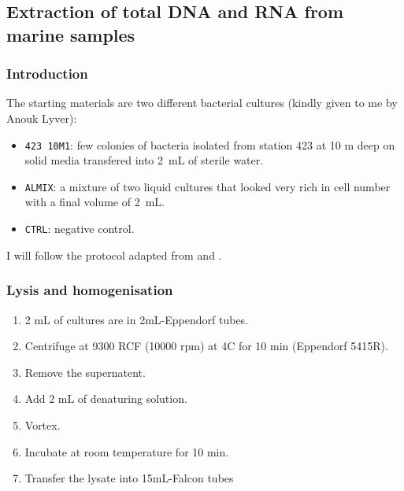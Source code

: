 \subsection{Extraction of total DNA and RNA from marine samples}
\label{task:20180112_cj1}


\subsubsection{Introduction}

The starting materials are two different bacterial cultures (kindly given to me by Anouk Lyver):
\begin{itemize}
\item[] \texttt{423 10M1}: few colonies of bacteria isolated from station 423 at 10 m deep on solid media transfered into 2~mL of sterile water.
\item[] \texttt{ALMIX}: a mixture of two liquid cultures that looked very rich in cell number with a final volume of 2~mL.
\item[] \texttt{CTRL}: negative control.
\end{itemize}

I will follow the protocol adapted from \citet{schneider2017extraction} and \citet{chomczynski2006single}.

\subsubsection{Lysis and homogenisation}

\begin{enumerate}
\item 2 mL of cultures are in 2mL-Eppendorf tubes.
\item Centrifuge at 9300 RCF (10000 rpm) at 4\degree C for 10 min (Eppendorf 5415R).
\item Remove the supernatent.
\item Add 2 mL of denaturing solution.
\item Vortex.
\item Incubate at room temperature for 10 min.
\item Transfer the lysate into 15mL-Falcon tubes
\end{enumerate}


